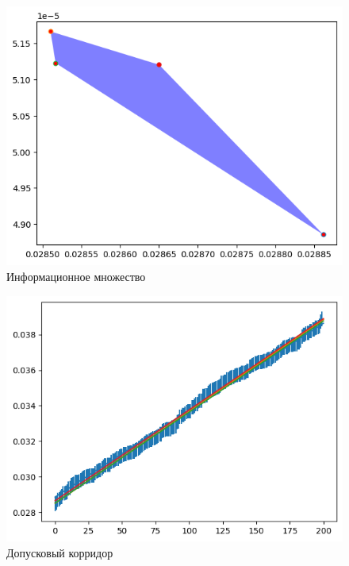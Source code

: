 \documentclass[12pt,a4paper]{article}
\begin{document}
\begin{figure}[H]
    \centering
    \includegraphics[width=14cm]{4_2.png}
    \caption{Информационное множество}
    \label{fig:info}
\end{figure}

\begin{figure}[H]
    \centering
    \includegraphics[width=14cm]{4_3.png}
    \caption{Допусковый корридор}
    \label{fig:info}
\end{figure}
\end{document}
